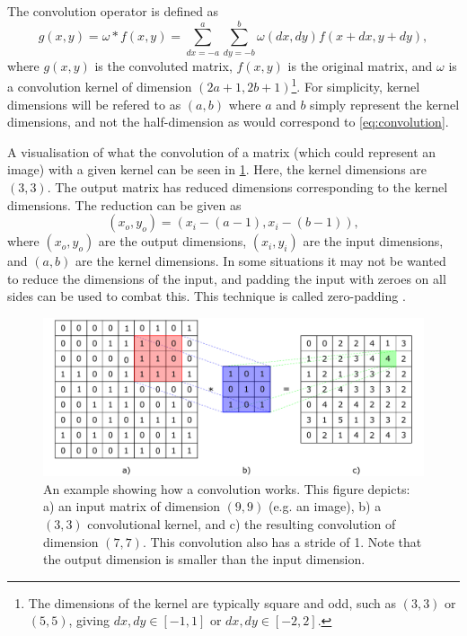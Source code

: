 The convolution operator is defined as 
\begin{equation}
    \label{eq:convolution}
    g(x,y) = \omega \ast f(x,y) = \sum_{dx=-a}^{a}\sum_{dy=-b}^{b} \omega(dx,dy)f(x+dx,y+dy),
\end{equation}
where $g(x,y)$ is the convoluted matrix, $f(x,y)$ is the original matrix, and $\omega$ is a convolution kernel of dimension $(2a+1,2b+1)$\footnote{The dimensions of the kernel are typically square and odd, such as $(3,3)$ or $(5,5)$, giving $dx,dy\in[-1,1]$ or $dx,dy\in[-2,2]$. }. For simplicity, kernel dimensions will be refered to as $(a,b)$ where $a$ and $b$ simply represent the kernel dimensions, and not the half-dimension as would correspond to \cref{eq:convolution}. 

A visualisation of what the convolution of a matrix (which could represent an image) with a given kernel can be seen in \cref{fig:convolution}. Here, the kernel dimensions are $(3,3)$. The output matrix has reduced dimensions corresponding to the kernel dimensions. The reduction can be given as 
\begin{equation}
    \left( x_o,y_o \right) = \left( x_i - \left(a - 1\right), x_i - \left( b - 1 \right) \right),
\end{equation}
where $(x_o,y_o)$ are the output dimensions, $(x_i,y_i)$ are the input dimensions, and $(a,b)$ are the kernel dimensions. In some situations it may not be wanted to reduce the dimensions of the input, and padding the input with zeroes on all sides can be used to combat this. This technique is called zero-padding \cite{oshea2015introduction}. 
\begin{figure}[htbp]  
    \centering
    \includegraphics[width=.85\textwidth]{figures/convolution.pdf}
    \caption[Convolution example]{An example showing how a convolution works. This figure depicts: a) an input matrix of dimension $(9,9)$ (e.g. an image), b) a $(3,3)$ convolutional kernel, and c) the resulting convolution of dimension $(7,7)$. This convolution also has a stride of 1. Note that the output dimension is smaller than the input dimension. }
    \label{fig:convolution}
\end{figure}

